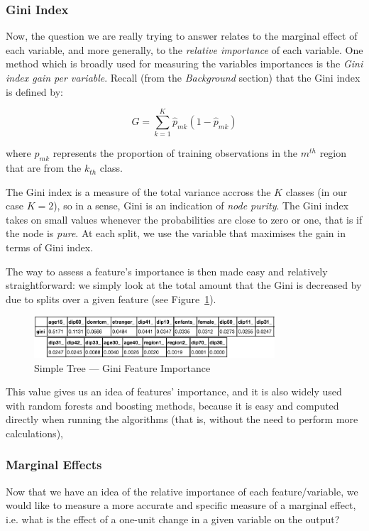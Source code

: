\subsubsection{Gini Index}
Now, the question we are really trying to answer relates to the marginal effect of each variable, and more generally, to the \textit{relative importance} of each variable. One method which is broadly used for measuring the variables importances is the \textit{Gini index gain per variable}. Recall (from the \textit{Background} section) that the Gini index is defined by:

\begin{equation}
    G = \sum_{k=1}^{K} \hat{p}_{mk}(1-\hat{p}_{mk})
\end{equation}

where $\hat{p}_{mk}$ represents the proportion of training observations in the $m^{th}$ region that are from the $k_{th}$ class.

The Gini index is a measure of the total variance accross the $K$ classes (in our case $K=2$), so in a sense, Gini is an indication of \textit{node purity}. The Gini index takes on small values whenever the probabilities are close to zero or one, that is if the node is \textit{pure}. At each split, we use the variable that maximises the gain in terms of Gini index.

The way to assess a feature's importance is then made easy and relatively straightforward: we simply look at the total amount that the Gini is decreased by due to splits over a given feature (see Figure~\ref{fig:simple_tree_gini}).

\begin{figure}
    \centering
    \includegraphics[width=0.8\textwidth]{img/simple_tree_gini.png}
    \caption{Simple Tree --- Gini Feature Importance}
    \label{fig:simple_tree_gini}
\end{figure}

This value gives us an idea of features' importance, and it is also widely used with random forests and boosting methods, because it is easy and computed directly when running the algorithms (that is, without the need to perform more calculations),

\subsubsection{Marginal Effects}
Now that we have an idea of the relative importance of each feature/variable, we would like to measure a more accurate and specific measure of a marginal effect, i.e. what is the effect of a one-unit change in a given variable on the output?

